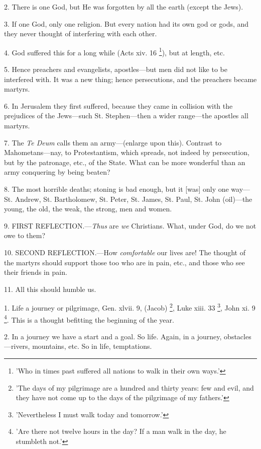 2. There is one God, but He was forgotten by all
the earth (except the Jews).

3. If one God, only one religion. But every
nation had its own god or gods, and they never thought of interfering
with each other.

4. God suffered this for a long while (Acts xiv.
16 \footnote{'Who in times past
suffered all nations to walk in their own ways.'}), but at length, etc.

5. Hence preachers and evangelists,
apostles—but men did not like to be interfered with. It was a new
thing; hence persecutions, and the preachers became martyrs.

6. In Jerusalem they first suffered, because they
came in collision with the prejudices of the Jews—such St.
Stephen—then a wider range—the apostles all martyrs.

7. The \emph{Te Deum} calls them an
army—(enlarge upon this). Contrast to Mahometans—nay, to
Protestantism, which spreads, not indeed by persecution, but by the
patronage, etc., of the State. What can be more wonderful than an army
conquering by being beaten?

8. The most horrible deaths; stoning is bad
enough, but it [was] only one way—St. Andrew, St. Bartholomew, St.
Peter, St. James, St. Paul, St. John (oil)—the young, the old, the
weak, the strong, men and women.

9. FIRST REFLECTION.—\emph{Thus}
are \emph{we} Christians. What, under God, do we not owe to them?

10. SECOND
REFLECTION.—How \emph{comfortable}
our lives are! The thought of the martyrs should support those too who
are in pain, etc., and those who see their friends in pain.

11. All this should humble us.


1. Life a journey or pilgrimage, Gen. xlvii. 9,
(Jacob) \footnote{'The days of my pilgrimage
are a hundred and thirty years: few and evil, and they have not come
up to the days of the pilgrimage of my fathers.'}, Luke xiii. 33 \footnote{'Nevertheless I must walk
today and tomorrow.'}, John xi. 9 \footnote{'Are there not twelve
hours in the day? If a man walk in the day, he stumbleth not.'}. This
is a thought befitting the beginning of the year.

2. In a journey we have a start and a goal. So
life. Again, in a journey, obstacles—rivers, mountains, etc. So in
life, temptations.

